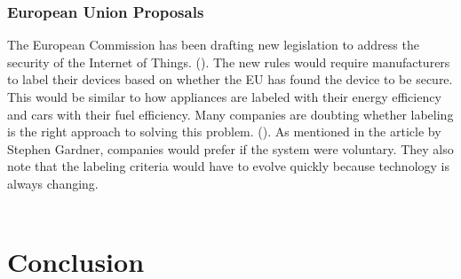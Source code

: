 \documentclass[letterpaper, 12pt]{article}
\begin{document}
\begin{flushleft}
\subsubsection*{European Union Proposals}

The European Commission has been drafting new legislation to address the security of the Internet of Things. (\cite{Stupp}). The new rules would require
manufacturers to label their devices based on whether the EU has found the device to be secure. This would be similar to how appliances are labeled with
their energy efficiency and cars with their fuel efficiency. Many companies are doubting whether labeling is the right approach to solving this problem.
(\cite{Gardner}). As mentioned in the article by Stephen Gardner, companies would prefer if the system were voluntary. They also note that the labeling 
criteria would have to evolve quickly because technology is always changing.\\
~\newline





\section*{Conclusion}


\end{flushleft}
\end{document}
